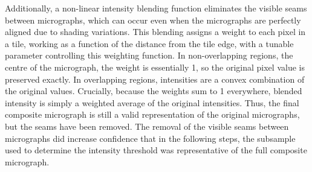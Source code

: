 \documentclass[review]{elsarticle}
\begin{document}
Additionally, a non-linear intensity blending function eliminates the visible
seams between micrographs, which can occur even when the micrographs are
perfectly aligned due to shading variations. This blending assigns a weight to
each pixel in a tile, working as a function of the distance from the tile edge,
with a tunable parameter controlling this weighting function. In non-overlapping
regions, the centre of the micrograph, the weight is essentially 1, so the
original pixel value is preserved exactly. In overlapping regions, intensities
are a convex combination of the original values. Crucially, because the weights
sum to 1 everywhere, blended intensity is simply a weighted average of the
original intensities. Thus, the final composite micrograph is still a valid
representation of the original micrographs, but the seams have been removed.
\citep{Preibisch2009}  The removal of the visible seams between micrographs did
increase confidence that in the following steps, the subsample used to determine
the intensity threshold was representative of the full composite micrograph.
\clearpage


\end{document}
